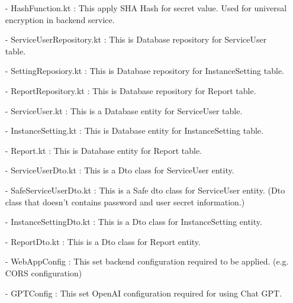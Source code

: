 \documentclass[conference]{IEEEtran}
\begin{document}
\begin{enumerate}
        \item [-] HashFunction.kt : This apply SHA Hash for secret value. Used for universal encryption in backend service.\\
        \item [-] ServiceUserRepository.kt : This is Database repository for ServiceUser table.\\
        \item [-] SettingReposiory.kt : This is Database repository for InstanceSetting table.\\
        \item [-] ReportRepository.kt : This is Database repository for Report table.\\
        \item [-] ServiceUser.kt : This is a Database entity for ServiceUser table.\\
        \item [-] InstanceSetting.kt : This is Database entity for InstanceSetting table.\\
        \item [-] Report.kt : This is  Database entity for Report table. \\
        \item [-] ServiceUserDto.kt : This is a Dto class for ServiceUser entity.\\
        \item [-] SafeServiceUserDto.kt : This is a  Safe dto class for ServiceUser entity. (Dto class that doesn't contains
password and user secret information.)\\
        \item [-] InstanceSettingDto.kt : This is a Dto class for InstanceSetting entity.\\
        \item [-] ReportDto.kt : This is a Dto class for Report entity.\\
        \item [-] WebAppConfig : This set backend configuration required to be applied. (e.g. CORS configuration)\
        \item [-] GPTConfig : This set OpenAI configuration required for using Chat GPT.\\
\end{enumerate}

\vspace{4cm}
\end{document}
